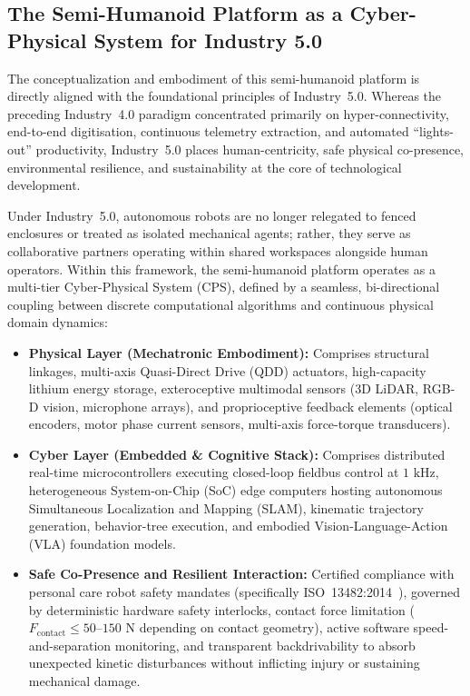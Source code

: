 \subsection{The Semi-Humanoid Platform as a Cyber-Physical System for Industry 5.0}
The conceptualization and embodiment of this semi-humanoid platform is directly aligned with the foundational principles of Industry~5.0. Whereas the preceding Industry~4.0 paradigm concentrated primarily on hyper-connectivity, end-to-end digitisation, continuous telemetry extraction, and automated ``lights-out'' productivity, Industry~5.0 places human-centricity, safe physical co-presence, environmental resilience, and sustainability at the core of technological development. 

Under Industry~5.0, autonomous robots are no longer relegated to fenced enclosures or treated as isolated mechanical agents; rather, they serve as collaborative partners operating within shared workspaces alongside human operators. Within this framework, the semi-humanoid platform operates as a multi-tier Cyber-Physical System (CPS), defined by a seamless, bi-directional coupling between discrete computational algorithms and continuous physical domain dynamics:
\begin{itemize}[leftmargin=1.5em]
  \item \textbf{Physical Layer (Mechatronic Embodiment):} Comprises structural linkages, multi-axis Quasi-Direct Drive (QDD) actuators, high-capacity lithium energy storage, exteroceptive multimodal sensors (3D LiDAR, RGB-D vision, microphone arrays), and proprioceptive feedback elements (optical encoders, motor phase current sensors, multi-axis force-torque transducers).
  \item \textbf{Cyber Layer (Embedded \& Cognitive Stack):} Comprises distributed real-time microcontrollers executing closed-loop fieldbus control at $1\text{ kHz}$, heterogeneous System-on-Chip (SoC) edge computers hosting autonomous Simultaneous Localization and Mapping (SLAM), kinematic trajectory generation, behavior-tree execution, and embodied Vision-Language-Action (VLA) foundation models.
  \item \textbf{Safe Co-Presence and Resilient Interaction:} Certified compliance with personal care robot safety mandates (specifically ISO~13482:2014~\cite{iso13482}), governed by deterministic hardware safety interlocks, contact force limitation ($F_{\text{contact}} \le 50\text{--}150\text{ N}$ depending on contact geometry), active software speed-and-separation monitoring, and transparent backdrivability to absorb unexpected kinetic disturbances without inflicting injury or sustaining mechanical damage.
\end{itemize}

